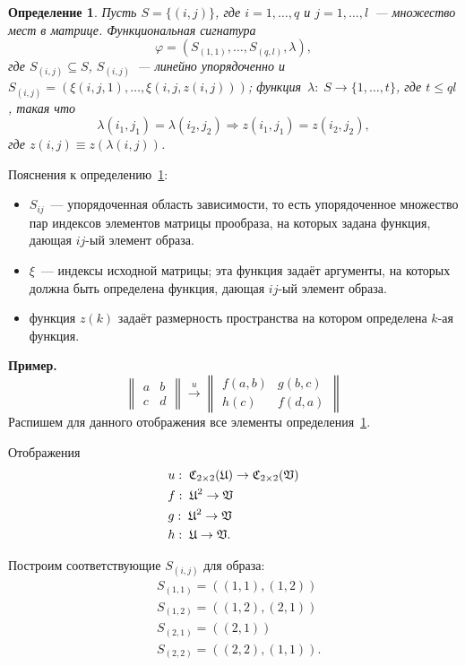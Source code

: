 \documentclass[a4paper, 12pt]{report}
\newtheorem{definition}{Определение}[chapter]
\begin{document}
\begin{definition}
\label{def::sign}
Пусть $S = \{ (i, j) \}$, где $i = 1,\ldots, q$ и $j = 1,\ldots, l$~--- множество мест в матрице. Функциональная сигнатура
\[
\varphi = (S_{(1,1)}, \ldots, S_{(q, l)}, \lambda),
\]
где $S_{(i, j)} \subseteq S$, $S_{(i,j)}$~--- линейно упорядоченно и $S_{(i,j)} = (\xi(i, j, 1), \ldots, \xi(i, j, z(i, j)))$; функция~$\lambda: \;S \rightarrow \{1, \ldots, t\}$, где $t \leq ql$, такая что
\[
\lambda(i_1, j_1) = \lambda(i_2, j_2) \Rightarrow z(i_1, j_1) = z(i_2, j_2),
\]
где $z(i, j) \equiv z(\lambda(i, j))$.
\end{definition}
Пояснения к определению~\ref{def::sign}:
\begin{itemize}
\item $S_{ij}$~--- упорядоченная область зависимости, то есть упорядоченное множество пар индексов элементов матрицы прообраза, на которых задана функция, дающая $ij$-ый элемент образа.
\item $\xi$~--- индексы исходной матрицы; эта функция задаёт аргументы, на которых должна быть определена функция, дающая $ij$-ый элемент образа.
\item функция $z(k)$ задаёт размерность пространства на котором определена $k$-ая функция.
\end{itemize}
\textbf{Пример.}
\[
\begin{Vmatrix}
a & b\\
c & d
\end{Vmatrix}
\mathop{\longrightarrow}\limits^u
\begin{Vmatrix}
f(a, b) & g(b, c)\\
h(c) & f(d, a)
\end{Vmatrix}
\]
Распишем для данного отображения все элементы определения~\ref{def::sign}.

Отображения
\begin{equation*}
\begin{split}
& u:\; \mathfrak{C}_{2 \times 2}(\mathfrak{U}) \rightarrow \mathfrak{C}_{2 \times 2}(\mathfrak{V}) \\
& f: \; \mathfrak{U}^2 \rightarrow \mathfrak{V} \\
& g: \; \mathfrak{U}^2 \rightarrow \mathfrak{V} \\
& h: \; \mathfrak{U} \rightarrow \mathfrak{V}.
\end{split}
\end{equation*}

Построим соответствующие $S_{(i,j)}$ для образа:
\begin{equation*}
\begin{split}
& S_{(1,1)} = ((1, 1), (1, 2)) \\
& S_{(1, 2)} = ((1, 2), (2, 1)) \\
& S_{(2, 1)} = ((2, 1)) \\
& S_{(2, 2)} = ((2, 2), (1, 1)).
\end{split}
\end{equation*}
\end{document}
